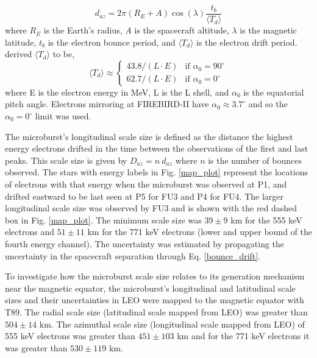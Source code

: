 \documentclass[draft, linenumbers]{agujournal}
\begin{document}
\begin{equation}
d_{az} = 2 \pi (R_E + A) \cos(\lambda) \frac{t_b}{\langle T_{d} \rangle}
\label{bounce_drift}
\end{equation} where $R_E$ is the Earth's radius, $A$ is the spacecraft altitude, $\lambda$ is the magnetic latitude, $t_b$ is the electron bounce period, and $\langle T_{d} \rangle$ is the electron drift period. \citet{Parks2003} derived $\langle T_{d} \rangle$ to be,
\begin{equation}
\langle T_{d} \rangle \approx
\begin{cases}
43.8 /(L \cdot E) & \text{if } \alpha_0 = 90^{\circ} \\    62.7/(L \cdot E) & \text{if } \alpha_0 = 0^{\circ}
\end{cases}
\label{drift}
\end{equation} where E is the electron energy in MeV, L is the L shell, and $\alpha_0$ is the equatorial pitch angle. Electrons mirroring at FIREBIRD-II have $\alpha_0 {\approx} 3.7^{\circ}$ and so the $\alpha_0 = 0^{\circ}$ limit was used.

The microburst's longitudinal scale size is defined as the distance the highest energy electrons drifted in the time between the observations of the first and last peaks. This scale size is given by $D_{az} = n \ d_{az}$ where $n$ is the number of bounces observed. The stars with energy labels in Fig. \ref{map_plot} represent the locations of electrons with that energy when the microburst was observed at P1, and drifted eastward to be last seen at P5 for FU3 and P4 for FU4. The larger longitudinal scale size was observed by FU3 and is shown with the red dashed box in Fig. \ref{map_plot}. The minimum scale size was $ 39 \pm 9$ km for the 555 keV electrons and $ 51 \pm 11$ km for the 771 keV electrons (lower and upper bound of the fourth energy channel). The uncertainty was estimated by propagating the uncertainty in the spacecraft separation through Eq. \ref{bounce_drift}.

To investigate how the microburst scale size relates to its generation mechanism near the magnetic equator, the microburst's longitudinal and latitudinal scale sizes and their uncertainties in LEO were mapped to the magnetic equator with T89. The radial scale size (latitudinal scale mapped from LEO) was greater than $504 \pm​ 14$ km. The azimuthal scale size (longitudinal scale mapped from LEO) of 555 keV electrons was greater than $451 \pm 103$ km and for the 771 keV electrons it was greater than $530 \pm 119$ km.
\end{document}

